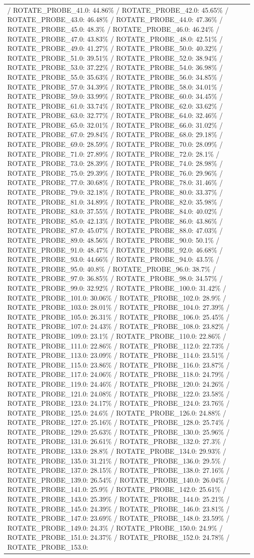 \documentclass[parskip=half]{scrartcl}
\begin{document}
\begin{tabular}{l|l}
/ ROTATE_PROBE_41.0: 44.86\% / ROTATE_PROBE_42.0: 45.65\% / ROTATE_PROBE_43.0: 46.48\% / ROTATE_PROBE_44.0: 47.36\% / ROTATE_PROBE_45.0: 48.3\% / ROTATE_PROBE_46.0: 46.24\% / ROTATE_PROBE_47.0: 43.83\% / ROTATE_PROBE_48.0: 42.51\% / ROTATE_PROBE_49.0: 41.27\% / ROTATE_PROBE_50.0: 40.32\% / ROTATE_PROBE_51.0: 39.51\% / ROTATE_PROBE_52.0: 38.94\% / ROTATE_PROBE_53.0: 37.22\% / ROTATE_PROBE_54.0: 36.98\% / ROTATE_PROBE_55.0: 35.63\% / ROTATE_PROBE_56.0: 34.85\% / ROTATE_PROBE_57.0: 34.39\% / ROTATE_PROBE_58.0: 34.01\% / ROTATE_PROBE_59.0: 33.99\% / ROTATE_PROBE_60.0: 34.45\% / ROTATE_PROBE_61.0: 33.74\% / ROTATE_PROBE_62.0: 33.62\% / ROTATE_PROBE_63.0: 32.77\% / ROTATE_PROBE_64.0: 32.46\% / ROTATE_PROBE_65.0: 32.01\% / ROTATE_PROBE_66.0: 31.02\% / ROTATE_PROBE_67.0: 29.84\% / ROTATE_PROBE_68.0: 29.18\% / ROTATE_PROBE_69.0: 28.59\% / ROTATE_PROBE_70.0: 28.09\% / ROTATE_PROBE_71.0: 27.89\% / ROTATE_PROBE_72.0: 28.1\% / ROTATE_PROBE_73.0: 28.39\% / ROTATE_PROBE_74.0: 28.98\% / ROTATE_PROBE_75.0: 29.39\% / ROTATE_PROBE_76.0: 29.96\% / ROTATE_PROBE_77.0: 30.68\% / ROTATE_PROBE_78.0: 31.46\% / ROTATE_PROBE_79.0: 32.18\% / ROTATE_PROBE_80.0: 33.37\% / ROTATE_PROBE_81.0: 34.89\% / ROTATE_PROBE_82.0: 35.98\% / ROTATE_PROBE_83.0: 37.55\% / ROTATE_PROBE_84.0: 40.02\% / ROTATE_PROBE_85.0: 42.13\% / ROTATE_PROBE_86.0: 43.86\% / ROTATE_PROBE_87.0: 45.07\% / ROTATE_PROBE_88.0: 47.03\% / ROTATE_PROBE_89.0: 48.56\% / ROTATE_PROBE_90.0: 50.1\% / ROTATE_PROBE_91.0: 48.47\% / ROTATE_PROBE_92.0: 46.68\% / ROTATE_PROBE_93.0: 44.66\% / ROTATE_PROBE_94.0: 43.5\% / ROTATE_PROBE_95.0: 40.8\% / ROTATE_PROBE_96.0: 38.7\% / ROTATE_PROBE_97.0: 36.85\% / ROTATE_PROBE_98.0: 34.57\% / ROTATE_PROBE_99.0: 32.92\% / ROTATE_PROBE_100.0: 31.42\% / ROTATE_PROBE_101.0: 30.06\% / ROTATE_PROBE_102.0: 28.9\% / ROTATE_PROBE_103.0: 28.01\% / ROTATE_PROBE_104.0: 27.39\% / ROTATE_PROBE_105.0: 26.31\% / ROTATE_PROBE_106.0: 25.45\% / ROTATE_PROBE_107.0: 24.43\% / ROTATE_PROBE_108.0: 23.82\% / ROTATE_PROBE_109.0: 23.1\% / ROTATE_PROBE_110.0: 22.86\% / ROTATE_PROBE_111.0: 22.86\% / ROTATE_PROBE_112.0: 22.73\% / ROTATE_PROBE_113.0: 23.09\% / ROTATE_PROBE_114.0: 23.51\% / ROTATE_PROBE_115.0: 23.86\% / ROTATE_PROBE_116.0: 23.87\% / ROTATE_PROBE_117.0: 24.06\% / ROTATE_PROBE_118.0: 24.79\% / ROTATE_PROBE_119.0: 24.46\% / ROTATE_PROBE_120.0: 24.26\% / ROTATE_PROBE_121.0: 24.08\% / ROTATE_PROBE_122.0: 23.58\% / ROTATE_PROBE_123.0: 24.17\% / ROTATE_PROBE_124.0: 23.76\% / ROTATE_PROBE_125.0: 24.6\% / ROTATE_PROBE_126.0: 24.88\% / ROTATE_PROBE_127.0: 25.16\% / ROTATE_PROBE_128.0: 25.74\% / ROTATE_PROBE_129.0: 25.63\% / ROTATE_PROBE_130.0: 25.96\% / ROTATE_PROBE_131.0: 26.61\% / ROTATE_PROBE_132.0: 27.3\% / ROTATE_PROBE_133.0: 28.8\% / ROTATE_PROBE_134.0: 29.93\% / ROTATE_PROBE_135.0: 31.21\% / ROTATE_PROBE_136.0: 29.5\% / ROTATE_PROBE_137.0: 28.15\% / ROTATE_PROBE_138.0: 27.16\% / ROTATE_PROBE_139.0: 26.54\% / ROTATE_PROBE_140.0: 26.04\% / ROTATE_PROBE_141.0: 25.9\% / ROTATE_PROBE_142.0: 25.61\% / ROTATE_PROBE_143.0: 25.39\% / ROTATE_PROBE_144.0: 25.21\% / ROTATE_PROBE_145.0: 24.39\% / ROTATE_PROBE_146.0: 23.81\% / ROTATE_PROBE_147.0: 23.69\% / ROTATE_PROBE_148.0: 23.59\% / ROTATE_PROBE_149.0: 24.3\% / ROTATE_PROBE_150.0: 24.9\% / ROTATE_PROBE_151.0: 24.37\% / ROTATE_PROBE_152.0: 24.78\% / ROTATE_PROBE_153.0: 
\end{tabular}
\end{document}
